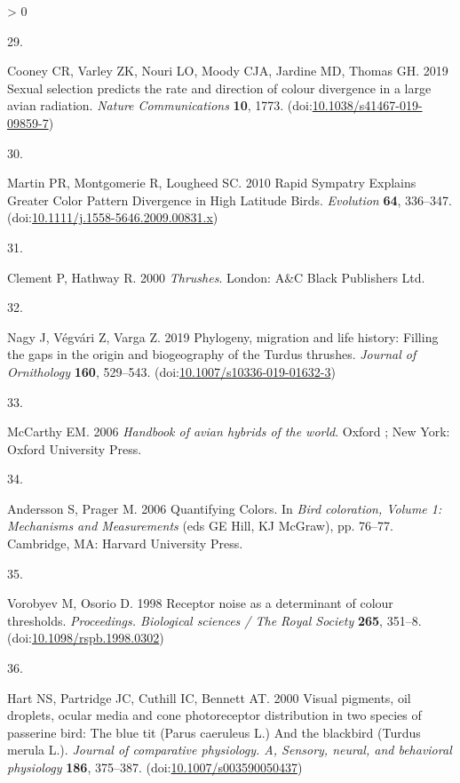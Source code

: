 \documentclass[
  a4paper,
]{article}
\newlength{\cslhangindent}
\newlength{\csllabelwidth}
\newenvironment{CSLReferences}[2] %
 {%
  \setlength{\parindent}{0pt}
  \ifodd #1 \everypar{\setlength{\hangindent}{\cslhangindent}}\ignorespaces\fi
  \ifnum #2 > 0
  \setlength{\parskip}{#2\baselineskip}
  \fi
 }%
 {}
\newcommand{\CSLLeftMargin}[1]{\parbox[t]{\csllabelwidth}{#1}}
\newcommand{\CSLRightInline}[1]{\parbox[t]{\linewidth - \csllabelwidth}{#1}\break}
\begin{document}
\begin{CSLReferences}{0}{0}
\leavevmode\hypertarget{ref-cooney2019}{}%
\CSLLeftMargin{29. }
\CSLRightInline{Cooney CR, Varley ZK, Nouri LO, Moody CJA, Jardine MD,
Thomas GH. 2019 Sexual selection predicts the rate and direction of
colour divergence in a large avian radiation. \emph{Nature
Communications} \textbf{10}, 1773.
(doi:\href{https://doi.org/10.1038/s41467-019-09859-7}{10.1038/s41467-019-09859-7})}

\leavevmode\hypertarget{ref-martin2010}{}%
\CSLLeftMargin{30. }
\CSLRightInline{Martin PR, Montgomerie R, Lougheed SC. 2010 Rapid
{Sympatry Explains Greater Color Pattern Divergence} in {High Latitude
Birds}. \emph{Evolution} \textbf{64}, 336--347.
(doi:\href{https://doi.org/10.1111/j.1558-5646.2009.00831.x}{10.1111/j.1558-5646.2009.00831.x})}

\leavevmode\hypertarget{ref-clement2000}{}%
\CSLLeftMargin{31. }
\CSLRightInline{Clement P, Hathway R. 2000 \emph{Thrushes}. {London}:
{A\&C Black Publishers Ltd}. }

\leavevmode\hypertarget{ref-nagy2019}{}%
\CSLLeftMargin{32. }
\CSLRightInline{Nagy J, Végvári Z, Varga Z. 2019 Phylogeny, migration
and life history: Filling the gaps in the origin and biogeography of the
{Turdus} thrushes. \emph{Journal of Ornithology} \textbf{160}, 529--543.
(doi:\href{https://doi.org/10.1007/s10336-019-01632-3}{10.1007/s10336-019-01632-3})}

\leavevmode\hypertarget{ref-mccarthy2006}{}%
\CSLLeftMargin{33. }
\CSLRightInline{McCarthy EM. 2006 \emph{Handbook of avian hybrids of the
world}. {Oxford ; New York}: {Oxford University Press}. }

\leavevmode\hypertarget{ref-andersson2006}{}%
\CSLLeftMargin{34. }
\CSLRightInline{Andersson S, Prager M. 2006 Quantifying {Colors}. In
\emph{Bird coloration, {Volume} 1: {Mechanisms} and {Measurements}} (eds
GE Hill, KJ McGraw), pp. 76--77. {Cambridge, MA}: {Harvard University
Press}. }

\leavevmode\hypertarget{ref-vorobyev1998}{}%
\CSLLeftMargin{35. }
\CSLRightInline{Vorobyev M, Osorio D. 1998 Receptor noise as a
determinant of colour thresholds. \emph{Proceedings. Biological sciences
/ The Royal Society} \textbf{265}, 351--8.
(doi:\href{https://doi.org/10.1098/rspb.1998.0302}{10.1098/rspb.1998.0302})}

\leavevmode\hypertarget{ref-hart2000}{}%
\CSLLeftMargin{36. }
\CSLRightInline{Hart NS, Partridge JC, Cuthill IC, Bennett AT. 2000
Visual pigments, oil droplets, ocular media and cone photoreceptor
distribution in two species of passerine bird: {The} blue tit ({Parus}
caeruleus {L}.) And the blackbird ({Turdus} merula {L}.). \emph{Journal
of comparative physiology. A, Sensory, neural, and behavioral
physiology} \textbf{186}, 375--387.
(doi:\href{https://doi.org/10.1007/s003590050437}{10.1007/s003590050437})}


\end{CSLReferences}
\end{document}
